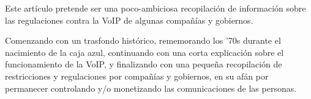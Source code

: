Este artículo pretende ser una poco-ambiciosa recopilación de información sobre las regulaciones contra la VoIP de algunas compañías y gobiernos.

Comenzando con un trasfondo histórico, rememorando los '70s durante el nacimiento de la caja azul, continuando con una corta explicación sobre el funcionamiento de la VoIP, y finalizando con una pequeña recopilación de restricciones y regulaciones por compañías y gobiernos, en su afán por permanecer controlando y/o monetizando las comunicaciones de las personas.
